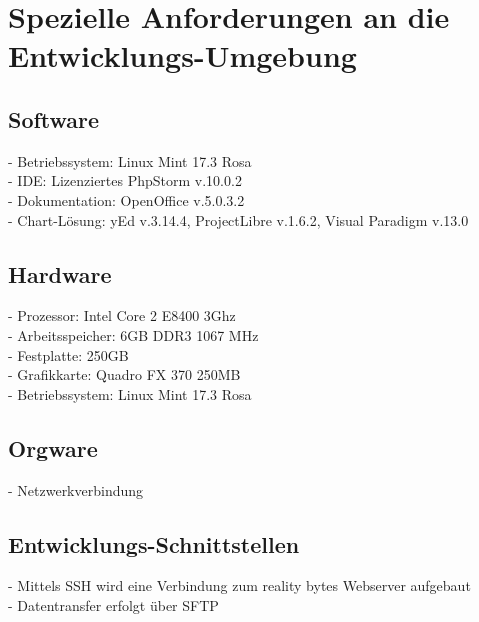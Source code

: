 \section{Spezielle Anforderungen an die Entwicklungs-Umgebung}

    \subsection{Software}

        - Betriebssystem: Linux Mint 17.3 Rosa \\
        - IDE: Lizenziertes PhpStorm v.10.0.2 \\
        - Dokumentation: OpenOffice v.5.0.3.2 \\
        - Chart-Lösung: yEd v.3.14.4, ProjectLibre v.1.6.2, Visual Paradigm v.13.0

    \subsection{Hardware}
        - Prozessor: Intel Core 2 E8400 3Ghz \\
        - Arbeitsspeicher: 6GB DDR3 1067 MHz \\
        - Festplatte: 250GB \\
        - Grafikkarte: Quadro FX 370 250MB \\
        - Betriebssystem: Linux Mint 17.3 Rosa

    \subsection{Orgware}
        - Netzwerkverbindung

    \subsection{Entwicklungs-Schnittstellen}
        - Mittels \gls{SSH} wird eine Verbindung zum reality bytes Webserver aufgebaut \\
        - Datentransfer erfolgt über \gls{SFTP}